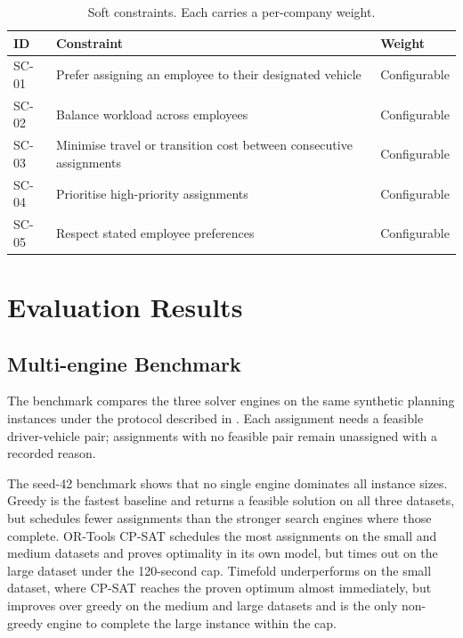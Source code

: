 \begin{table}[h]
\centering
\caption{Soft constraints. Each carries a per-company weight.}
\label{tab:soft-constraints}
\small
\begin{tabularx}{\textwidth}{@{}
  p{}
  X
  p{}
@{}}
\toprule
\textbf{ID} & \textbf{Constraint} & \textbf{Weight} \\
\midrule
SC-01 & Prefer assigning an employee to their designated vehicle & Configurable \\
SC-02 & Balance workload across employees & Configurable \\
SC-03 & Minimise travel or transition cost between consecutive assignments & Configurable \\
SC-04 & Prioritise high-priority assignments & Configurable \\
SC-05 & Respect stated employee preferences & Configurable \\
\bottomrule
\end{tabularx}
\end{table}

\section{Evaluation Results}
\label{sec:evaluation-results}

\subsection{Multi-engine Benchmark}
\label{sec:algorithm}
\label{sec:algorithm-benchmark}

The benchmark compares the three solver engines on the same synthetic planning instances under the protocol described in . Each assignment needs a feasible driver-vehicle pair; assignments with no feasible pair remain unassigned with a recorded reason.

The seed-42 benchmark shows that no single engine dominates all instance sizes. Greedy is the fastest baseline and returns a feasible solution on all three datasets, but schedules fewer assignments than the stronger search engines where those complete. OR-Tools CP-SAT schedules the most assignments on the small and medium datasets and proves optimality in its own model, but times out on the large dataset under the 120-second cap. Timefold underperforms on the small dataset, where CP-SAT reaches the proven optimum almost immediately, but improves over greedy on the medium and large datasets and is the only non-greedy engine to complete the large instance within the cap.

